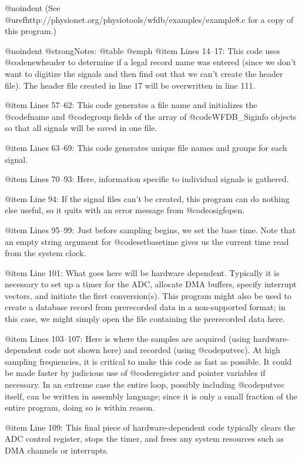 {{{{{{{{{@noindent
(See @uref{http://physionet.org/physiotools/wfdb/examples/example8.c}
for a copy of this program.)

@noindent
@strong{Notes:}
@table @emph
@item Lines 14--17:
This code uses @code{newheader} to determine if a legal record name was
entered (since we don't want to digitize the signals and then find out
that we can't create the header file).  The header file
created in line 17 will be overwritten in line 111.

@item Lines 57--62:
This code generates a file name and initializes the @code{fname} and
@code{group} fields of the array of @code{WFDB_Siginfo} objects so that all
signals will be saved in one file.

@item Lines 63--69:
This code generates unique file names and groups for each signal.

@item Lines 70--93:
Here, information specific to individual signals is gathered.

@item Line 94:
If the signal files can't be created, this program can do nothing else
useful, so it quits with an error message from @code{osigfopen}.

@item Lines 95--99:
Just before sampling begins, we set the base time.  Note that an empty
string argument for @code{setbasetime} gives us the current time read from
the system clock.

@item Line 101:
What goes here will be hardware dependent.  Typically it is necessary to
set up a timer for the ADC, allocate DMA buffers, specify interrupt vectors,
and initiate the first conversion(s).  This program might also be used to
create a database record from prerecorded data in a non-supported format;
in this case, we might simply open the file containing the prerecorded data
here.

@item Lines 103--107:
Here is where the samples are acquired (using hardware-dependent code
not shown here) and recorded (using @code{putvec}).  At high sampling
frequencies, it is critical to make this code as fast as possible.  It
could be made faster by judicious use of @code{register} and pointer
variables if necessary.  In an extreme case the entire loop, possibly
including @code{putvec} itself, can be written in assembly language;
since it is only a small fraction of the entire program, doing so is
within reason.

@item Line 109:
This final piece of hardware-dependent code typically clears the ADC
control register, stops the timer, and frees any system resources such as
DMA channels or interrupts.

}}}}}}}}}
